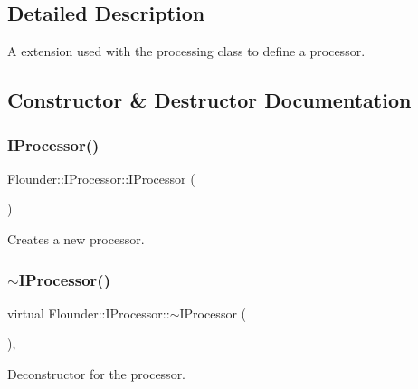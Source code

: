 \subsection{Detailed Description}
A extension used with the processing class to define a processor. 



\subsection{Constructor \& Destructor Documentation}
\mbox{\label{class_flounder_1_1_i_processor_a188f027950354063be0f78b5298729e9}} 
\subsubsection{\texorpdfstring{I\+Processor()}{IProcessor()}}
{\footnotesize\ttfamily Flounder\+::\+I\+Processor\+::\+I\+Processor (\begin{DoxyParamCaption}{ }\end{DoxyParamCaption})\hspace{0.3cm}{\ttfamily [inline]}}



Creates a new processor. 

\mbox{\label{class_flounder_1_1_i_processor_ad5e6323fe51d4dfe32b5c2249511ff0b}} 
\subsubsection{\texorpdfstring{$\sim$\+I\+Processor()}{~IProcessor()}}
{\footnotesize\ttfamily virtual Flounder\+::\+I\+Processor\+::$\sim$\+I\+Processor (\begin{DoxyParamCaption}{ }\end{DoxyParamCaption})\hspace{0.3cm}{\ttfamily [inline]}, {\ttfamily [virtual]}}



Deconstructor for the processor. 



